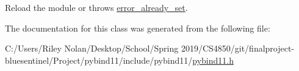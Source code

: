 Reload the module or throws {\ttfamily \mbox{\hyperlink{classerror__already__set}{error\+\_\+already\+\_\+set}}}. 



The documentation for this class was generated from the following file\+:\begin{DoxyCompactItemize}
\item 
C\+:/\+Users/\+Riley Nolan/\+Desktop/\+School/\+Spring 2019/\+C\+S4850/git/finalproject-\/bluesentinel/\+Project/pybind11/include/pybind11/\mbox{\hyperlink{pybind11_8h}{pybind11.\+h}}\end{DoxyCompactItemize}
